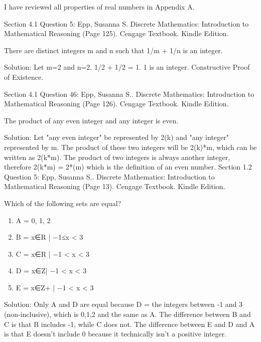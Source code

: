 \documentclass{article}
\begin{document}
\clearpage
\header
I have reviewed all properties of real numbers in Appendix A.

\clearpage
\header
Section 4.1 Question 5: Epp, Susanna S. Discrete Mathematics: Introduction to Mathematical Reasoning (Page 125). Cengage Textbook. Kindle Edition. 
\begin{algorithm}
There are distinct integers m and n such that 1/m + 1/n is an integer. 
\end{algorithm}

Solution: Let m=2 and n=2. 1/2 + 1/2 = 1. 1 is an integer. Constructive Proof of Existence.

\clearpage
\header
Section 4.1 Question 46: Epp, Susanna S.. Discrete Mathematics: Introduction to Mathematical Reasoning (Page 126). Cengage Textbook. Kindle Edition. 

\begin{algorithm}The product of any even integer and any integer is even.
\end{algorithm}
Solution: Let "any even integer" be represented by 2(k) and "any integer" represented by m.
The product of these two integers will be 2(k)*m, which can be written as 2(k*m).
The product of two integers is always another integer, therefore 2(k*m) = 2*(m) which is the definition of an even number.
\clearpage
\header
Section 1.2 Question 5: Epp, Susanna S.. Discrete Mathematics: Introduction to Mathematical Reasoning (Page 13). Cengage Textbook. Kindle Edition. 
\begin{algorithm}
Which of the following sets are equal?
\begin{enumerate}

\item A = {0, 1, 2} 
\item B = {x∈R | −1≤x < 3} 
\item C = {x∈R | −1 < x < 3} 
\item D = {x∈Z| −1 < x < 3} 
\item E = {x∈Z+ | −1 < x < 3}

\end{enumerate}
\end{algorithm}

Solution: Only A and D are equal because D = the integers between -1 and 3 (non-inclusive), which is {0,1,2} and the same as A. The difference between B and C is that B includes -1, while C does not. The difference between E and D and A is that E doesn't include 0 because it technically isn't a positive integer.
\end{document}
